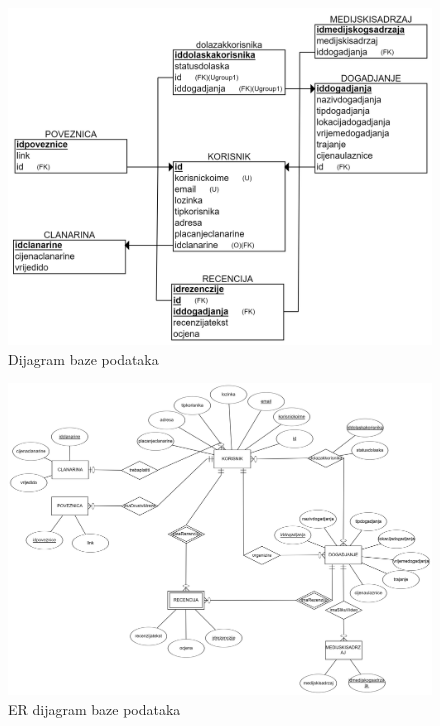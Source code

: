 				\begin{figure}[H]
					\includegraphics[width=\textwidth]{dijagrami/db_REL.png} 
					\centering
					\caption{Dijagram baze podataka}
					\label{fig:promjene}
				\end{figure}
				
				\newpage
				
				\begin{figure}[H]
					\includegraphics[width=\textwidth]{dijagrami/db_ER.png} 
					\centering
					\caption{ER dijagram baze podataka}
					\label{fig:promjene}
				\end{figure}
				
			\eject
			
